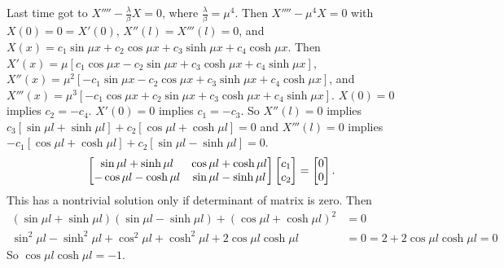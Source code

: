 \documentclass[]{article}
\begin{document}
\begin{example}
	 Last time got to $X''''- \frac{\lambda}{\beta} X = 0$, where $\frac{\lambda}{\beta} = \mu^4$. Then $X'''' - \mu^4 X = 0$ with $X(0) = 0 = X'(0)$, $X''(l) = X'''(l) = 0$, and $X(x) = c_1\sin{\mu x} + c_2\cos{\mu x} + c_3\sinh{\mu x} + c_4\cosh{\mu x}$. Then $X'(x) = \mu[c_1\cos{\mu x} - c_2\sin{\mu x} + c_3\cosh{\mu x} + c_4\sinh{\mu x}]$, $X''(x) = \mu^2 [ -c_1 \sin{\mu x} - c_2\cos{\mu x} + c_3 \sinh{\mu x} + c_4\cosh{\mu x}]$, and $X'''(x) = \mu^3 [ -c_1\cos{\mu x} + c_2 \sin{\mu x} + c_3 \cosh{\mu x} + c_4\sinh{\mu x}]$. $X(0) = 0$ implies $c_2 = -c_4$. $X'(0) = 0$ implies $c_1 = -c_3$. So $X''(l) = 0$ implies $c_3[\sin{\mu l} + \sinh{\mu l}] + c_2 [\cos{\mu l} + \cosh{\mu l}] = 0$ and $X'''(l) = 0$ implies $-c_1[\cos{\mu l} + \cosh{\mu l}] + c_2[\sin{\mu l} - \sinh{\mu l}] = 0$.
	$$\begin{bmatrix}\sin{\mu l} + \sinh{\mu l} & \cos{\mu l} + \cosh{\mu l} \\ -\cos{\mu l} - \cosh{\mu l} & \sin{\mu l} - \sinh{\mu l}\end{bmatrix} \begin{bmatrix}c_1\\c_2\end{bmatrix} = \begin{bmatrix}0\\0\end{bmatrix}.$$ This has a nontrivial solution only if determinant of matrix is zero. Then
	\begin{align*}
		(\sin{\mu l} + \sinh{\mu l})(\sin{\mu l}-\sinh{\mu l}) + (\cos{\mu l} + \cosh{\mu l})^2 &= 0 \\ \sin^2{\mu l} - \sinh^2{\mu l} + \cos^2{\mu l} + \cosh^2{\mu l} + 2\cos{\mu l} \cosh{\mu l} &= 0 = 2 + 2\cos{\mu l} \cosh{\mu l} = 0
	\end{align*}
	So $\cos{\mu l}\cosh{\mu l} = -1$.
\end{example}
\end{document}
